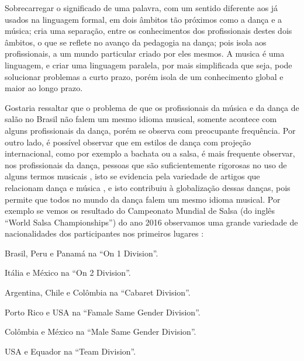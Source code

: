 Sobrecarregar o significado de uma palavra, com um sentido diferente aos já usados na linguagem formal, 
em dois âmbitos tão próximos como a dança e a música; cria uma separação, 
entre os conhecimentos dos profissionais destes dois âmbitos, o que se reflete no avanço da pedagogia na dança; 
pois isola aos profissionais, a um mundo particular criado por eles mesmos.  
A musica é uma linguagem, e criar uma linguagem paralela, por mais simplificada que seja, 
pode solucionar problemas a curto prazo, porém isola de um conhecimento global e maior ao longo prazo.

Gostaria ressaltar que o problema de que os profissionais da música e da dança de salão no Brasil não falem um mesmo idioma musical, 
somente acontece com alguns profissionais da dança, porém se observa com preocupante frequência. 
Por outro lado, é possível observar que em estilos de dança com projeção internacional, 
como por exemplo a bachata ou a salsa, 
é mais frequente observar, nos profissionais da dança, 
pessoas que são suficientemente rigorosas no uso de alguns termos musicais \FALTAREFERENCIA,
isto se evidencia pela variedade de artigos que relacionam dança e música \cite{10.1093.mts.mty033} \cite{10.3389.fnhum.2016.00064}, 
e isto contribuiu à globalização dessas danças, pois permite que todos no mundo da dança falem um mesmo idioma musical.
Por exemplo se vemos os resultado do Campeonato Mundial de Salsa (do inglês ``World Salsa Championships'')
do ano 2016 \cite{WSC2016} observamos uma grande variedade de nacionalidades dos participantes
nos primeiros lugares :
\begin{inparaitem}
\item Brasil, Peru e Panamá na ``On 1 Division''.
\item Itália e México na ``On 2 Division''.
\item Argentina, Chile e Colômbia na ``Cabaret Division''.
\item Porto Rico e USA na ``Famale Same Gender Division''.
\item Colômbia e México na ``Male Same Gender Division''.
\item USA e Equador na ``Team Division''.
\end{inparaitem}


